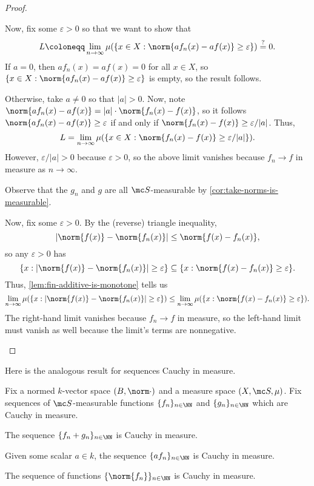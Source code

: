\documentclass[../notes.tex]{subfiles}
\begin{document}
\begin{proof}
\begin{listalph}
		Now, fix some $\varepsilon>0$ so that we want to show that
		\[L\coloneqq\lim_{n\to\infty}\mu(\{x\in X:\norm{af_n(x)-af(x)}\ge\varepsilon\})\stackrel?=0.\]
		If $a=0$, then $af_n(x)=af(x)=0$ for all $x\in X$, so $\{x\in X:\norm{af_n(x)-af(x)}\ge\varepsilon\}$ is empty, so the result follows.

		Otherwise, take $a\ne0$ so that $|a|>0$. Now, note $\norm{af_n(x)-af(x)}=|a|\cdot\norm{f_n(x)-f(x)}$, so it follows $\norm{af_n(x)-af(x)}\ge\varepsilon$ if and only if $\norm{f_n(x)-f(x)}\ge\varepsilon/|a|$. Thus,
		\[L=\lim_{n\to\infty}\mu(\{x\in X:\norm{f_n(x)-f(x)}\ge\varepsilon/|a|\}).\]
		However, $\varepsilon/|a|>0$ because $\varepsilon>0$, so the above limit vanishes because $f_n\to f$ in measure as $n\to\infty$.

		\item Observe that the $g_n$ and $g$ are all $\mc S$-measurable by \autoref{cor:take-norms-is-measurable}.

		Now, fix some $\varepsilon>0$. By the (reverse) triangle inequality,
		\[|\norm{f(x)}-\norm{f_n(x)}|\le\norm{f(x)-f_n(x)},\]
		so any $\varepsilon>0$ has
		\[\{x:|\norm{f(x)}-\norm{f_n(x)}|\ge\varepsilon\}\subseteq\{x:\norm{f(x)-f_n(x)}\ge\varepsilon\}.\]
		Thus, \autoref{lem:fin-additive-is-monotone} tells us
		\[\lim_{n\to\infty}\mu(\{x:|\norm{f(x)}-\norm{f_n(x)}|\ge\varepsilon\})\le\lim_{n\to\infty}\mu(\{x:\norm{f(x)-f_n(x)}\ge\varepsilon\}).\]
		The right-hand limit vanishes because $f_n\to f$ in measure, so the left-hand limit must vanish as well because the limit's terms are nonnegative.
		\qedhere
	\end{listalph}
\end{proof}
Here is the analogous result for sequences Cauchy in measure.
\begin{lemma} \label{lem:linear-combo-cauchy-in-measure}
	Fix a normed $k$-vector space $(B,\norm\cdot)$ and a measure space $(X,\mc S,\mu)$. Fix sequences of $\mc S$-measurable functions $\{f_n\}_{n\in\NN}$ and $\{g_n\}_{n\in\NN}$ which are Cauchy in measure.
	\begin{listalph}
		\item The sequence $\{f_n+g_n\}_{n\in\NN}$ is Cauchy in measure.
		\item Given some scalar $a\in k$, the sequence $\{af_n\}_{n\in\NN}$ is Cauchy in measure.
		\item The sequence of functions $\{\norm{f_n}\}_{n\in\NN}$ is Cauchy in measure.
	\end{listalph}
\end{lemma}
\end{document}
